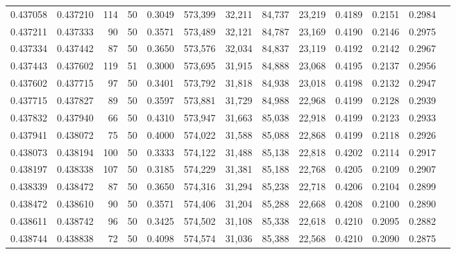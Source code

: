 \begin{tabular}{rrrrrrrrrrrrr}
0.437058 & 0.437210 &   114 &  50 &                                     0.3049 & 573,399 &  32,211 &  84,737 &  23,219 & 0.4189 & 0.2151 & 0.2984 \\
0.437211 & 0.437333 &    90 &  50 &                                     0.3571 & 573,489 &  32,121 &  84,787 &  23,169 & 0.4190 & 0.2146 & 0.2975 \\
0.437334 & 0.437442 &    87 &  50 &                                     0.3650 & 573,576 &  32,034 &  84,837 &  23,119 & 0.4192 & 0.2142 & 0.2967 \\
0.437443 & 0.437602 &   119 &  51 &                                     0.3000 & 573,695 &  31,915 &  84,888 &  23,068 & 0.4195 & 0.2137 & 0.2956 \\
0.437602 & 0.437715 &    97 &  50 &                                     0.3401 & 573,792 &  31,818 &  84,938 &  23,018 & 0.4198 & 0.2132 & 0.2947 \\
0.437715 & 0.437827 &    89 &  50 &                                     0.3597 & 573,881 &  31,729 &  84,988 &  22,968 & 0.4199 & 0.2128 & 0.2939 \\
0.437832 & 0.437940 &    66 &  50 &                                     0.4310 & 573,947 &  31,663 &  85,038 &  22,918 & 0.4199 & 0.2123 & 0.2933 \\
0.437941 & 0.438072 &    75 &  50 &                                     0.4000 & 574,022 &  31,588 &  85,088 &  22,868 & 0.4199 & 0.2118 & 0.2926 \\
0.438073 & 0.438194 &   100 &  50 &                                     0.3333 & 574,122 &  31,488 &  85,138 &  22,818 & 0.4202 & 0.2114 & 0.2917 \\
0.438197 & 0.438338 &   107 &  50 &                                     0.3185 & 574,229 &  31,381 &  85,188 &  22,768 & 0.4205 & 0.2109 & 0.2907 \\
0.438339 & 0.438472 &    87 &  50 &                                     0.3650 & 574,316 &  31,294 &  85,238 &  22,718 & 0.4206 & 0.2104 & 0.2899 \\
0.438472 & 0.438610 &    90 &  50 &                                     0.3571 & 574,406 &  31,204 &  85,288 &  22,668 & 0.4208 & 0.2100 & 0.2890 \\
0.438611 & 0.438742 &    96 &  50 &                                     0.3425 & 574,502 &  31,108 &  85,338 &  22,618 & 0.4210 & 0.2095 & 0.2882 \\
0.438744 & 0.438838 &    72 &  50 &                                     0.4098 & 574,574 &  31,036 &  85,388 &  22,568 & 0.4210 & 0.2090 & 0.2875 \\

\end{tabular}

